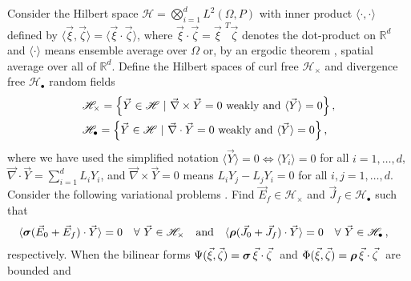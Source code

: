 \documentclass{cmslatex}
\newcommand\bsig{\mbox{\boldmath${\sigma}$}}
\newcommand\brho{\mbox{\boldmath${\rho}$}}
\begin{document}
Consider the Hilbert space $\mathscr{H}=\bigotimes_{i=1}^dL^2(\Omega,P)$ with inner
product $\langle\cdot,\cdot\rangle$ defined by $\langle\vec{\xi},\vec{\zeta}\rangle=\langle\vec{\xi}\cdot\vec{\zeta}\rangle$, where
$\vec{\xi}\cdot\vec{\zeta}=\vec{\xi}^{\;\,T}\vec{\zeta}$ denotes the dot-product 
on $\mathbb{R}^d$ and $\langle\cdot\rangle$ means ensemble average over $\Omega$ or, by an
ergodic theorem \cite{Golden:CMP-473}, spatial average over all of
${\mathbb{R}}^d$. Define the Hilbert spaces \cite{Golden:CMP-473} of
curl free $\mathscr{H}_\times$ and divergence free $\mathscr{H}_{\bullet}$ random
fields  
%
\begin{align}\label{eq:curlfreeHilbert}
  &\mathscr{H}_\times=
  \left\{\vec{Y}\in \mathscr{H} \ | \ \vec{\nabla} \times\vec{Y}=0 \text{ weakly and }
    \langle\vec{Y}\rangle=0
  \right\}, \\
&\mathscr{H}_{\bullet}=
\left\{\vec{Y}\in \mathscr{H} \ | \ \vec{\nabla}\cdot\vec{Y}=0 \text{ weakly and }
    \langle\vec{Y}\rangle=0\right\},\notag 
\end{align}  
%
%
where we have used the simplified notation $\langle\vec{Y}\rangle=0 \iff \langle Y_i\rangle=0$ for
all $i=1,\ldots,d$, $\vec{\nabla}\cdot\vec{Y}=\sum_{i=1}^dL_iY_i$, and $\vec{\nabla} \times\vec{Y}=0$
means $L_iY_j-L_jY_i=0$ for all $i,j=1,\ldots,d$. Consider the following
variational problems \cite{Golden:CMP-473}. Find
$\vec{E}_f\in\mathscr{H}_\times$ and $\vec{J}_f\in\mathscr{H}_\bullet$ such that     
%
\begin{align}
 \label{eq:Weak_Curl_Free_Variational_Form}
 &\langle\bsig(\vec{E}_0+\vec{E}_f)\cdot\vec{Y}\rangle=0 \quad  \forall \
  \vec{Y}\in\mathscr{H}_\times &&\text{and}
%
 &&\langle\brho(\vec{J}_0+\vec{J}_f)\cdot\vec{Y}\rangle=0 \quad  \forall \
  \vec{Y}\in\mathscr{H}_{\bullet}\,,  
\end{align}
%
respectively. When the bilinear forms
$\Psi(\vec{\xi},\vec{\zeta})=\bsig\,\vec{\xi}\cdot\vec{\zeta}\;$ and
$\Phi(\vec{\xi},\vec{\zeta})=\brho\,\vec{\xi}\cdot\vec{\zeta}\;$ are bounded and
\end{document}
